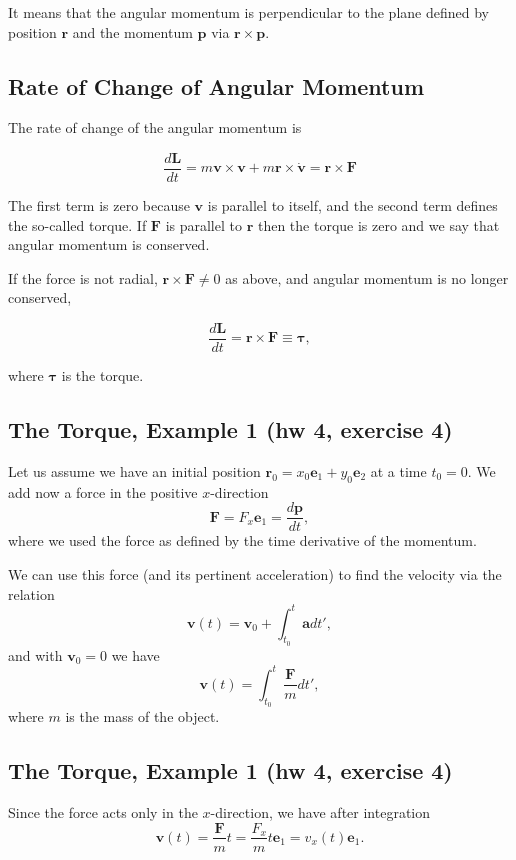 \documentclass[%
oneside,                 %
final,                   %
10pt]{article}
\begin{document}
It means that the angular momentum is perpendicular to the plane defined by position $\bm{r}$ and the momentum $\bm{p}$ via $\bm{r}\times \bm{p}$. 

\subsection*{Rate of Change of Angular Momentum}

The rate of change of the angular momentum is

\[
\frac{d\bm{L}}{dt}=m\bm{v}\times\bm{v}+m\bm{r}\times\dot{\bm{v}}=\bm{r}\times{\bm{F}}
\]

The first term is zero because $\bm{v}$ is parallel to itself, and the
second term defines the so-called torque. If $\bm{F}$ is parallel to $\bm{r}$ then the torque is zero and we say that angular momentum is conserved.

If the force is not radial, $\bm{r}\times\bm{F}\ne 0$ as above, and angular momentum is no longer conserved,

\begin{equation}
\frac{d\bm{L}}{dt}=\bm{r}\times\bm{F}\equiv\bm{\tau},
\end{equation}

where $\bm{\tau}$ is the torque.

\subsection*{The Torque, Example 1 (hw 4, exercise 4)}

Let us assume we have an initial position $\bm{r}_0=x_0\bm{e}_1+y_0\bm{e}_2$ at a time $t_0=0$.
We add now a force in the positive $x$-direction
\[
\bm{F}=F_x\bm{e}_1=\frac{d\bm{p}}{dt},
\]
where we used the force as defined by the time derivative of the momentum.

We can use this force (and its pertinent acceleration) to find the velocity via the relation
\[
\bm{v}(t)=\bm{v}_0+\int_{t_0}^t\bm{a}dt',
\]
and with $\bm{v}_0=0$ we have
\[
\bm{v}(t)=\int_{t_0}^t\frac{\bm{F}}{m}dt',
\]
where $m$ is the mass of the object.

\subsection*{The Torque, Example 1 (hw 4, exercise 4)}

Since the force acts only in the $x$-direction, we have after integration
\[
\bm{v}(t)=\frac{\bm{F}}{m}t=\frac{F_x}{m}t\bm{e}_1=v_x(t)\bm{e}_1.
\]
\end{document}
